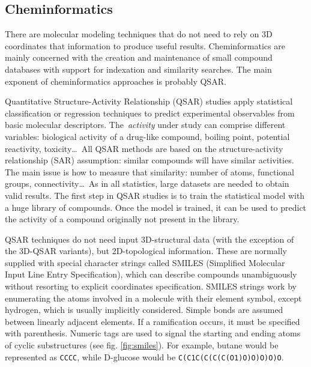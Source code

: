 \subsection{Cheminformatics}
There are molecular modeling techniques that do not need to rely on 3D coordinates that information to produce useful results. Cheminformatics are mainly concerned with the creation and maintenance of small compound databases with support for indexation and similarity searches. The main exponent of cheminformatics approaches is probably QSAR.

Quantitative Structure-Activity Relationship (QSAR) studies apply statistical classification or regression techniques to predict experimental observables from basic molecular descriptors. The\ \textit{activity} under study can comprise different variables: biological activity of a drug-like compound, boiling point, potential reactivity, toxicity\ldots\  All QSAR methods are based on the structure-activity relationship (SAR) assumption: similar compounds will have similar activities. The main issue is how to measure that similarity: number of atoms, functional groups, connectivity\ldots\   As in all statistics, large datasets are needed to obtain valid results. The first step in QSAR studies is to train the statistical model with a huge library of compounds. Once the model is trained, it can be used to predict the activity of a compound originally not present in the library.

QSAR techniques do not need input 3D-structural data (with the exception of the 3D-QSAR variants), but 2D-topological information. These are normally supplied with special character strings called SMILES (Simplified Molecular Input Line Entry Specification),\cite{smiles} which can describe compounds unambiguously without resorting to explicit coordinates specification. SMILES strings work by enumerating the atoms involved in a molecule with their element symbol, except hydrogen, which is usually implicitly considered. Simple bonds are assumed between linearly adjacent elements. If a ramification occurs, it must be specified with parenthesis. Numeric tags are used to signal the starting and ending atoms of cyclic substructures (see fig. \ref{fig:smiles}). For example, butane would be represented as \texttt{CCCC}, while D-glucose would be \texttt{C(C1C(C(C(C(O1)O)O)O)O)O}.


